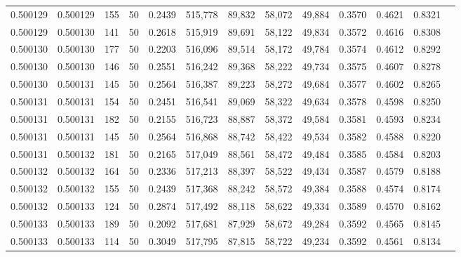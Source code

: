 \begin{tabular}{rrrrrrrrrrrrr}
0.500129 & 0.500129 &   155 &  50 &                                     0.2439 & 515,778 &  89,832 &  58,072 &  49,884 & 0.3570 & 0.4621 & 0.8321 \\
0.500129 & 0.500130 &   141 &  50 &                                     0.2618 & 515,919 &  89,691 &  58,122 &  49,834 & 0.3572 & 0.4616 & 0.8308 \\
0.500130 & 0.500130 &   177 &  50 &                                     0.2203 & 516,096 &  89,514 &  58,172 &  49,784 & 0.3574 & 0.4612 & 0.8292 \\
0.500130 & 0.500130 &   146 &  50 &                                     0.2551 & 516,242 &  89,368 &  58,222 &  49,734 & 0.3575 & 0.4607 & 0.8278 \\
0.500130 & 0.500131 &   145 &  50 &                                     0.2564 & 516,387 &  89,223 &  58,272 &  49,684 & 0.3577 & 0.4602 & 0.8265 \\
0.500131 & 0.500131 &   154 &  50 &                                     0.2451 & 516,541 &  89,069 &  58,322 &  49,634 & 0.3578 & 0.4598 & 0.8250 \\
0.500131 & 0.500131 &   182 &  50 &                                     0.2155 & 516,723 &  88,887 &  58,372 &  49,584 & 0.3581 & 0.4593 & 0.8234 \\
0.500131 & 0.500131 &   145 &  50 &                                     0.2564 & 516,868 &  88,742 &  58,422 &  49,534 & 0.3582 & 0.4588 & 0.8220 \\
0.500131 & 0.500132 &   181 &  50 &                                     0.2165 & 517,049 &  88,561 &  58,472 &  49,484 & 0.3585 & 0.4584 & 0.8203 \\
0.500132 & 0.500132 &   164 &  50 &                                     0.2336 & 517,213 &  88,397 &  58,522 &  49,434 & 0.3587 & 0.4579 & 0.8188 \\
0.500132 & 0.500132 &   155 &  50 &                                     0.2439 & 517,368 &  88,242 &  58,572 &  49,384 & 0.3588 & 0.4574 & 0.8174 \\
0.500132 & 0.500133 &   124 &  50 &                                     0.2874 & 517,492 &  88,118 &  58,622 &  49,334 & 0.3589 & 0.4570 & 0.8162 \\
0.500133 & 0.500133 &   189 &  50 &                                     0.2092 & 517,681 &  87,929 &  58,672 &  49,284 & 0.3592 & 0.4565 & 0.8145 \\
0.500133 & 0.500133 &   114 &  50 &                                     0.3049 & 517,795 &  87,815 &  58,722 &  49,234 & 0.3592 & 0.4561 & 0.8134 \\

\end{tabular}

